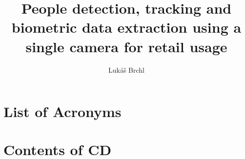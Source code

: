 \documentclass[thesis=M,english]{prefs/FITthesis}[2019/03/06]
\title{People detection, tracking and biometric data extraction using a single camera for retail
usage}
\author{Luk{\' a}{\v s} Brchl} %
\begin{document}






\appendix

\chapter{List of Acronyms}
\begin{description}
\end{description}

\chapter{Contents of CD}\label{app:CDcontent}

\begin{figure}
\end{figure}
\end{document}
